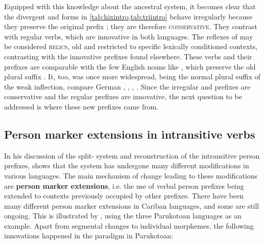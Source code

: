 Equipped with this knowledge about the ancestral system, it becomes clear that the divergent \hixka and \trio forms in \cref{tab:hixintro,tab:triintro} behave irregularly because they preserve the original \PC {} prefix ; they are therefore \textsc{conservative}.
They contrast with regular  verbs, which are innovative in both languages.
The reflexes of  may be considered \textsc{relics}, old and restricted to specific lexically conditioned contexts, contrasting with the innovative prefixes found elsewhere.
These verbs and their prefixes are comparable with the few English nouns like , which preserve the old plural suffix .
It, too, was once more widespread, being the normal plural suffix of the weak inflection, compare German  ,  ,  ,  .
Since the irregular \hixka and \trio prefixes are conservative and the regular prefixes are innovative, the next question to be addressed is where these new prefixes came from.


%

\subsection{Person marker extensions in intransitive verbs}
\label{sec:extensions_intro}
In his discussion of the \PC split- system and reconstruction of the intransitive person prefixes, \textcite[88--96]{gildea1998} shows that the system has undergone many different modifications in various languages.
The main mechanism of change leading to these modifications are \textbf{person marker extensions}, i.e. the use of verbal person prefixes being extended to contexts previously occupied by other prefixes.
There have been many different person marker extensions in Cariban languages, and some are still ongoing.
This is illustrated by \textcite{gildea1998}, using the three Parukotoan languages as an example.
Apart from segmental changes to individual morphemes, the following innovations happened in the \setone paradigm in Parukotoan:

